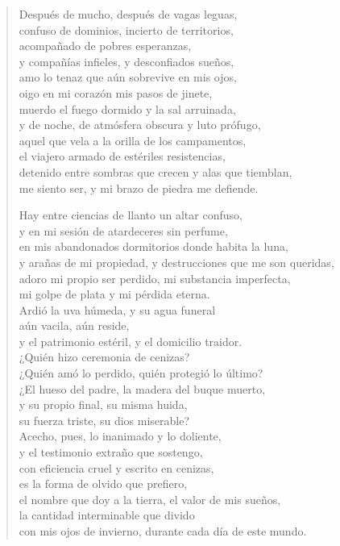 \documentclass[12pt]{article}
\begin{document}
\clearpage
{}
\begin{verse}

Después de mucho, después de vagas leguas,\\
confuso de dominios, incierto de territorios,\\
acompañado de pobres esperanzas,\\
y compañías infieles, y desconfiados sueños,\\
amo lo tenaz que aún sobrevive en mis ojos,\\
oigo en mi corazón mis pasos de jinete,\\
muerdo el fuego dormido y la sal arruinada,\\
y de noche, de atmósfera obscura y luto prófugo,\\
aquel que vela a la orilla de los campamentos,\\
el viajero armado de estériles resistencias,\\
detenido entre sombras que crecen y alas que tiemblan,\\
me siento ser, y mi brazo de piedra me defiende.  

Hay entre ciencias de llanto un altar confuso,\\
y en mi sesión de atardeceres sin perfume,\\
en mis abandonados dormitorios donde habita la luna,\\
y arañas de mi propiedad, y destrucciones que me son queridas,\\
adoro mi propio ser perdido, mi substancia imperfecta,\\
mi golpe de plata y mi pérdida eterna.\\
Ardió la uva húmeda, y su agua funeral\\
aún vacila, aún reside,\\
y el patrimonio estéril, y el domicilio traidor.\\
¿Quién hizo ceremonia de cenizas?\\
¿Quién amó lo perdido, quién protegió lo último?\\
¿El hueso del padre, la madera del buque muerto,\\
y su propio final, su misma huida,\\
su fuerza triste, su dios miserable?\\
Acecho, pues, lo inanimado y lo doliente,\\
y el testimonio extraño que sostengo,\\
con eficiencia cruel y escrito en cenizas,\\
es la forma de olvido que prefiero,\\
el nombre que doy a la tierra, el valor de mis sueños,\\
la cantidad interminable que divido\\
con mis ojos de invierno, durante cada día de este mundo.

\end{verse}
\end{document}
